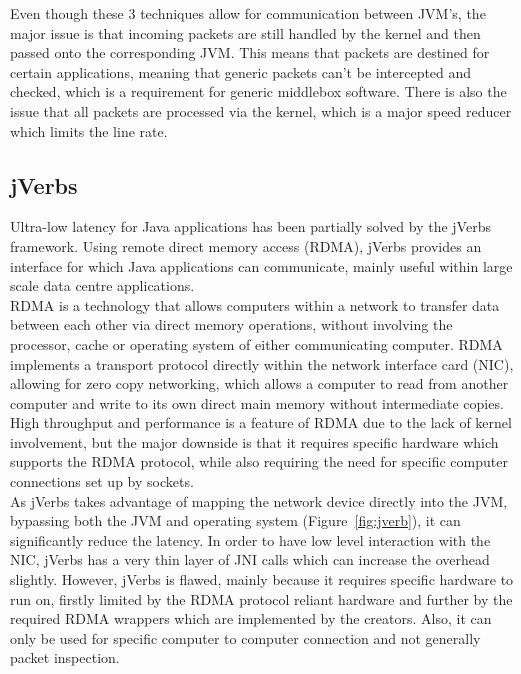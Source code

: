 \documentclass[interim_report.tex]{subfiles}
\begin{document}
Even though these 3 techniques allow for communication between JVM's, the major issue is that incoming packets are still handled by the kernel and then passed onto the corresponding JVM. This means that packets are destined for certain applications, meaning that generic packets can't be intercepted and checked, which is a requirement for generic middlebox software. There is also the issue that all packets are processed via the kernel, which is a major speed reducer which limits the line rate.

\subsection{jVerbs}
Ultra-low latency for Java applications has been partially solved by the jVerbs \cite{jverbs} framework. Using remote direct memory access (RDMA), jVerbs provides an interface for which Java applications can communicate, mainly useful within large scale data centre applications. \\
\newline
RDMA is a technology that allows computers within a network to transfer data between each other via direct memory operations, without involving the processor, cache or operating system of either communicating computer. RDMA implements a transport protocol directly within the network interface card (NIC), allowing for zero copy networking, which allows a computer to read from another computer and write to its own direct main memory without intermediate copies. High throughput and performance is a feature of RDMA due to the lack of kernel involvement, but the major downside is that it requires specific hardware which supports the RDMA protocol, while also requiring the need for specific computer connections set up by sockets. \\
\newline
As jVerbs takes advantage of mapping the network device directly into the JVM, bypassing both the JVM and operating system (Figure~\ref{fig:jverb}), it can significantly reduce the latency. In order to have low level interaction with the NIC, jVerbs has a very thin layer of JNI calls which can increase the overhead slightly. However, jVerbs is flawed, mainly because it requires specific hardware to run on, firstly limited by the RDMA protocol reliant hardware and further by the required RDMA wrappers which are implemented by the creators. Also, it can only be used for specific computer to computer connection and not generally packet inspection. 
\end{document}
